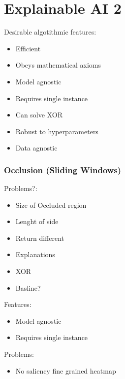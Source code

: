 \section{Explainable AI 2}
Desirable algotithmic features:
\begin{itemize}
    \item Efficient
    \item Obeys mathematical axioms
    \item Model agnostic
    \item Requires single instance
    \item Can solve XOR
    \item Robust to hyperparameters
    \item Data agnostic
\end{itemize}
\subsubsection{Occlusion (Sliding Windows)}
Problems?:
\begin{itemize}
    \item Size of Occluded region
    \item Lenght of side
    \item Return different
    \item Explanations
    \item XOR
    \item Basline?
\end{itemize}
Features:
\begin{itemize}
    \item Model agnostic
    \item Requires single instance
\end{itemize}
Problems:
\begin{itemize}
    \item No saliency fine grained heatmap
\end{itemize}

